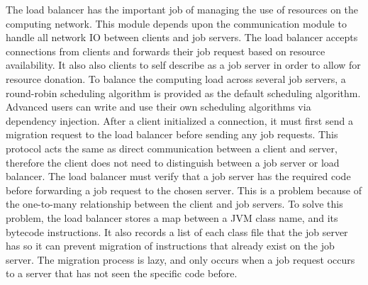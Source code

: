 The load balancer has the important job of managing the use of resources
on the computing network.
This module depends upon the communication module to handle all network IO
between clients and job servers.
The load balancer accepts connections from clients and forwards their job
request based on resource availability.
It also also clients to self describe as a job server in order to allow for
resource donation.
To balance the computing load across several job servers, a round-robin
scheduling algorithm is provided as the default scheduling algorithm.
Advanced users can write and use their own scheduling algorithms via dependency
injection.
After a client initialized a connection, it must first send a migration request
to the load balancer before sending any job requests.
This protocol acts the same as direct communication between a client and server,
therefore the client does not need to distinguish between a job server or load
balancer.
The load balancer must verify that a job server has the required
code before forwarding a job request to the chosen server.
This is a problem because of the one-to-many relationship between the client
and job servers.
To solve this problem, the load balancer stores a map between
a JVM class name, and its bytecode instructions.
It also records a list of each class file that the job server has so it can
prevent migration of instructions that already exist on the job server.
The migration process is lazy, and only occurs when a job request
occurs to a server that has not seen the specific code before.
